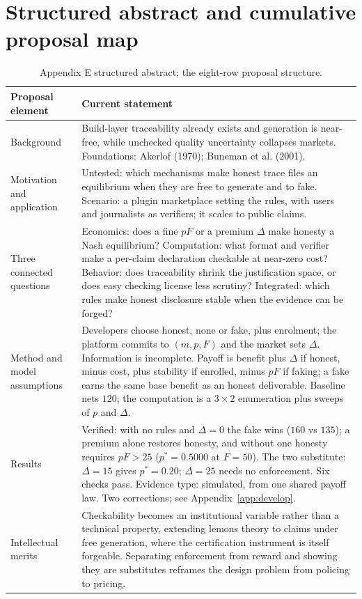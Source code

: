 \section{Structured abstract and cumulative proposal map}\label{app:abstract}
\par\medskip
\begin{table}[H]
\caption{Appendix E structured abstract; the eight-row proposal structure.}
\label{tab:abstract-map}
\renewcommand{\arraystretch}{1.18}
\begin{tabularx}{\textwidth}{@{}p{}Y@{}}
\toprule
\textbf{Proposal element} & \textbf{Current statement} \\
\midrule
Background & Build-layer traceability already exists and generation is near-free, while unchecked quality uncertainty collapses markets. Foundations: Akerlof (1970); Buneman et al. (2001). \\
Motivation and application & Untested: which mechanisms make honest trace files an equilibrium when they are free to generate and to fake. Scenario: a plugin marketplace setting the rules, with users and journalists as verifiers; it scales to public claims. \\
Three connected questions & Economics: does a fine $pF$ or a premium $\Delta$ make honesty a Nash equilibrium? Computation: what format and verifier make a per-claim declaration checkable at near-zero cost? Behavior: does traceability shrink the justification space, or does easy checking license less scrutiny? Integrated: which rules make honest disclosure stable when the evidence can be forged? \\
Method and model assumptions & Developers choose honest, none or fake, plus enrolment; the platform commits to $(m,p,F)$ and the market sets $\Delta$. Information is incomplete. Payoff is benefit plus $\Delta$ if honest, minus cost, plus stability if enrolled, minus $pF$ if faking; a fake earns the same base benefit as an honest deliverable. Baseline nets $120$; the computation is a $3\times2$ enumeration plus sweeps of $p$ and $\Delta$. \\
Results & Verified: with no rules and $\Delta=0$ the fake wins ($160$ vs $135$); a premium alone restores honesty, and without one honesty requires $pF>25$ ($p^{*}=0.5000$ at $F=50$). The two substitute: $\Delta=15$ gives $p^{*}=0.20$; $\Delta=25$ needs no enforcement. Six checks pass. Evidence type: simulated, from one shared payoff law. Two corrections; see Appendix~\ref{app:develop}. \\
Intellectual merits & Checkability becomes an institutional variable rather than a technical property, extending lemons theory to claims under free generation, where the certification instrument is itself forgeable. Separating enforcement from reward and showing they are substitutes reframes the design problem from policing to pricing. \\

\end{tabularx}
\end{table}
